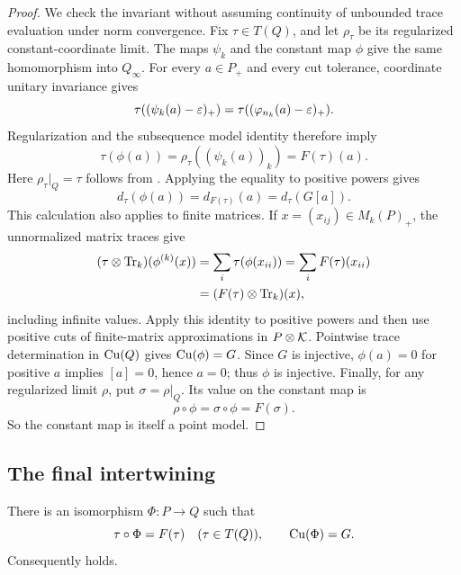 \begin{proof}
We check the invariant without assuming continuity of
unbounded trace evaluation under norm convergence.
Fix \(\tau\in T(Q)\), and let \(\rho_\tau\) be its
regularized constant-coordinate limit.
The maps \(\psi_k\) and the constant map \(\phi\)
give the same homomorphism into \(Q_\infty\).
For every \(a\in P_+\) and every cut tolerance,
coordinate unitary invariance gives
\[
 \tau((\psi_k(a)-\varepsilon)_+)
   =\tau((\varphi_{n_k}(a)-\varepsilon)_+).
\]
Regularization and the subsequence model identity
therefore imply
\[
 \tau(\phi(a))
 =\rho_\tau((\psi_k(a))_k)
 =F(\tau)(a).
\]
Here \(\rho_\tau|_Q=\tau\) follows from
.  Applying the equality to
positive powers gives
\[
 d_\tau(\phi(a))=d_{F(\tau)}(a)
               =d_\tau(G[a]).
\]
This calculation also applies to finite matrices. If
\(x=(x_{ij})\in M_k(P)_+\), the unnormalized matrix traces give
\begin{align*}
 (\tau\otimes\operatorname{Tr}_k)(\phi^{(k)}(x))
 &=\sum_i\tau(\phi(x_{ii}))
 =\sum_i F(\tau)(x_{ii})\\
 &=(F(\tau)\otimes\operatorname{Tr}_k)(x),
\end{align*}
including infinite values. Apply this identity to positive
powers and then use positive cuts of finite-matrix
approximations in \(P\otimes\mathcal K\). Pointwise trace
determination in \(\operatorname{Cu}(Q)\) gives \(\operatorname{Cu}(\phi)=G\).
Since \(G\) is injective, \(\phi(a)=0\) for positive
\(a\) implies \([a]=0\), hence \(a=0\);
thus \(\phi\) is injective.
Finally, for any regularized limit \(\rho\), put
\(\sigma=\rho|_Q\).  Its value on the constant map is
\[
 \rho\circ\phi=\sigma\circ\phi=F(\sigma).
\]
So the constant map is itself a point model.
\end{proof}

\subsection{The final intertwining}

\begin{theorem}\label{pt:intertwining}
There is an isomorphism \(\Phi:P\to Q\) such that
\[
 \tau\circ\Phi=F(\tau)\quad(\tau\in T(Q)),
 \qquad \operatorname{Cu}(\Phi)=G.
\]
Consequently  holds.
\end{theorem}

